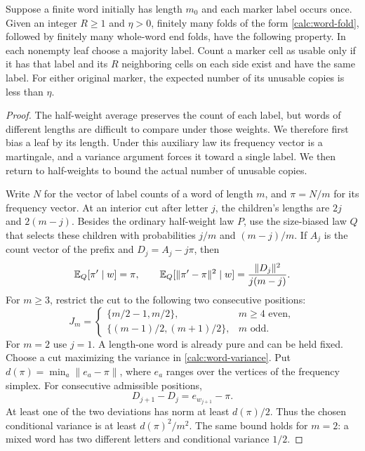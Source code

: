 \begin{lemma}
\label{calc:word-purification}
Suppose a finite word initially has length $m_0$ and each marker
label occurs once. Given an integer $R\ge1$ and $\eta>0$, finitely
many folds of the form \eqref{calc:word-fold}, followed by finitely
many whole-word end folds, have the following property. In each
nonempty leaf choose a majority label. Count a marker cell as usable
only if it has that label and its $R$ neighboring cells on each side
exist and have the same label. For either original marker, the
expected number of its unusable copies is less than $\eta$.
\end{lemma}

\begin{proof}
The half-weight average preserves the count of each label, but words
of different lengths are difficult to compare under those weights.
We therefore first bias a leaf by its length. Under this auxiliary
law its frequency vector is a martingale, and a variance argument
forces it toward a single label. We then return to half-weights to
bound the actual number of unusable copies.

Write $N$ for the vector of label counts of a word of length $m$,
and $\pi=N/m$ for its frequency vector. At an interior cut after
letter $j$, the children's lengths are $2j$ and $2(m-j)$. Besides
the ordinary half-weight law $P$, use the size-biased law $Q$ that
selects these children with probabilities $j/m$ and $(m-j)/m$.
If $A_j$ is the count vector of the prefix and $D_j=A_j-j\pi$, then
\begin{equation}
 \mathbb E_Q[\pi'\mid w]=\pi,
 \qquad
 \mathbb E_Q[\|\pi'-\pi\|^2\mid w]
   =\frac{\|D_j\|^2}{j(m-j)}.
 \label{calc:word-variance}
\end{equation}
For $m\ge3$, restrict the cut to the following two consecutive
positions:
\[
 J_m=
 \begin{cases}
 \{m/2-1,m/2\},&m\ge4\text{ even},\\
 \{(m-1)/2,(m+1)/2\},&m\text{ odd}.
 \end{cases}
\]
For $m=2$ use $j=1$. A length-one word is already pure and can be
held fixed. Choose a cut maximizing the variance in
\eqref{calc:word-variance}. Put
$d(\pi)=\min_a\|e_a-\pi\|$, where $e_a$ ranges over the vertices of
the frequency simplex. For consecutive admissible positions,
\[
 D_{j+1}-D_j=e_{w_{j+1}}-\pi.
\]
At least one of the two deviations has norm at least $d(\pi)/2$.
Thus the chosen conditional variance is at least
$d(\pi)^2/m^2$. The same bound holds for $m=2$: a mixed word has
two different letters and conditional variance $1/2$.


\end{proof}
